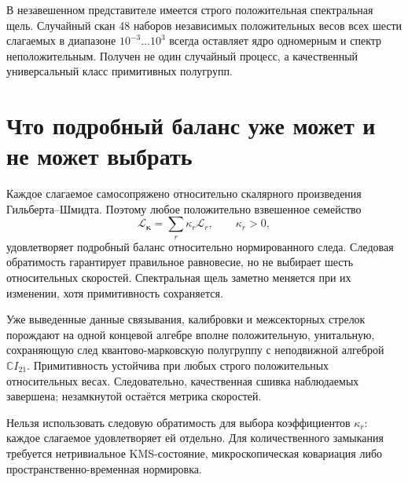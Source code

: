 В незавешенном представителе имеется строго положительная спектральная
щель. Случайный скан 48 наборов независимых положительных весов всех шести
слагаемых в диапазоне $10^{-3}\ldots10^3$ всегда оставляет ядро
одномерным и спектр неположительным. Получен не один случайный процесс, а
качественный универсальный класс примитивных полугрупп.

\section{Что подробный баланс уже может и не может выбрать}

Каждое слагаемое самосопряжено относительно скалярного произведения
Гильберта--Шмидта. Поэтому любое положительно взвешенное семейство
\begin{equation}
 \mathcal L_{\boldsymbol\kappa}
 =\sum_r\kappa_r\mathcal L_r,
 \qquad \kappa_r>0,
 \label{eq:v8-positive-rate-family}
\end{equation}
удовлетворяет подробный баланс относительно нормированного следа. Следовая
обратимость гарантирует правильное равновесие, но не выбирает шесть
относительных скоростей. Спектральная щель заметно меняется при их
изменении, хотя примитивность сохраняется.

\begin{theorem}
Уже выведенные данные связывания, калибровки и межсекторных стрелок порождают на одной
концевой алгебре вполне положительную, унитальную, сохраняющую след
квантово-марковскую полугруппу с неподвижной алгеброй $\mathbb CI_{21}$.
Примитивность устойчива при любых строго положительных относительных весах.
Следовательно, качественная сшивка наблюдаемых завершена; незамкнутой
остаётся метрика скоростей.
\end{theorem}

\begin{nogocriterion}
Нельзя использовать следовую обратимость для выбора коэффициентов
$\kappa_r$: каждое слагаемое удовлетворяет ей отдельно. Для количественного
замыкания требуется нетривиальное KMS-состояние, микроскопическая
ковариация либо пространственно-временная нормировка.
\end{nogocriterion}

